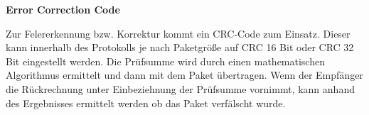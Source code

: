 \textbf{Error Correction Code}

Zur Felererkennung bzw. Korrektur kommt ein CRC-Code zum Einsatz. Dieser kann
innerhalb des Protokolls je nach Paketgr{\"o}{\ss}e auf CRC 16 Bit oder CRC 32
Bit eingestellt werden. Die Pr{\"u}fsumme wird durch einen mathematischen
Algorithmus ermittelt und dann mit dem Paket {\"u}bertragen. Wenn der
Empf{\"a}nger die R{\"u}ckrechnung unter Einbeziehnung der Pr{\"u}fsumme
vornimmt, kann anhand des Ergebnisses ermittelt werden ob das Paket
verf{\"a}lscht wurde.
